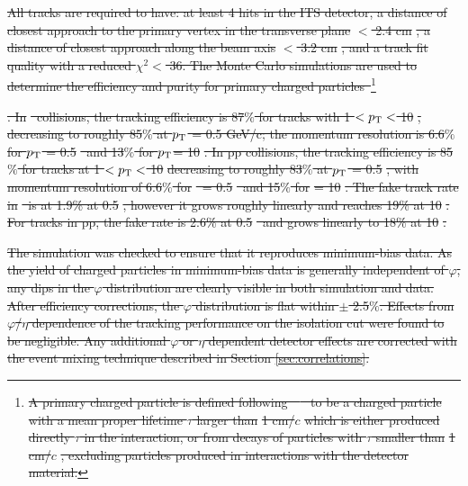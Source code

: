 \documentclass[ALICE,manyauthors]{cernphprep}
\newcommand{\pPb}          {\mbox{p--Pb}\xspace}
\newcommand{\pt}           {\ensuremath{p_{\rm T}}\xspace}
\newcommand{\GeVc}         {Ge\kern-.1emV/$c$\xspace}
\providecommand{\DIFdeltex}[1]{{\protect\color{red}\sout{#1}}}                      %
\providecommand{\DIFdelbegin}{} %
\providecommand{\DIFdel}[1]{\texorpdfstring{\DIFdeltex{#1}}{}} %
\newcommand{\DIFscaledelfig}{0.5}
\newlength{\DIFdelgraphicswidth} %
\newlength{\DIFdelgraphicsheight} %
\newcommand{\DIFdelincludegraphics}[2][]{%
\sbox{\DIFdelgraphicsbox}{\DIFOincludegraphics[#1]{#2}}%
\settoboxwidth{\DIFdelgraphicswidth}{\DIFdelgraphicsbox} %
\settoboxtotalheight{\DIFdelgraphicsheight}{\DIFdelgraphicsbox} %
\scalebox{\DIFscaledelfig}{%
\parbox[b]{\DIFdelgraphicswidth}{\usebox{\DIFdelgraphicsbox}\\[-\baselineskip] \rule{\DIFdelgraphicswidth}{0em}}\llap{\resizebox{\DIFdelgraphicswidth}{\DIFdelgraphicsheight}{%
\setlength{\unitlength}{\DIFdelgraphicswidth}%
\begin{picture}(1,1)%
\thicklines\linethickness{2pt} %
{\color[rgb]{1,0,0}\put(0,0){\framebox(1,1){}}}%
{\color[rgb]{1,0,0}\put(0,0){\line( 1,1){1}}}%
{\color[rgb]{1,0,0}\put(0,1){\line(1,-1){1}}}%
\end{picture}%
}\hspace*{3pt}}} %
} %
\DeclareRobustCommand{\DIFdelbegin}{\DIFOdelbegin \let\includegraphics\DIFdelincludegraphics} %
\begin{document}
\DIFdelbegin \DIFdel{All tracks are required to have: at least 4 hits in the ITS detector, a distance of closest approach to the primary vertex in the transverse plane 
}%
\DIFdel{$<$ 2.4 cm}%
\DIFdel{,  a distance of closest approach along the beam axis }%
\DIFdel{$ < $ 3.2 cm}%
\DIFdel{, and a track fit quality with a reduced $\chi^{2}<$ 36.  
The Monte Carlo simulations are used to determine the efficiency and purity for primary charged particles~}\footnote{\DIFdel{A primary charged particle is defined following~\mbox{%
\cite{ALICE-PUBLIC-2017-005} }%
to be a charged particle with a mean proper lifetime $\tau$ larger than }%
\DIFdel{1 cm/$c$}%
\DIFdel{which is either produced directly $\tau$ in the interaction, or from decays of particles with $\tau$
smaller than }%
\DIFdel{1 cm/$c$}%
\DIFdel{, excluding particles produced in interactions with the detector material.}}%
\addtocounter{footnote}{-1}%
\DIFdel{. In }%
\DIFdel{~collisions, the tracking efficiency is 87$\%$ for tracks with 1 $< \pt <$ 10 }%
\DIFdel{, decreasing to roughly 85$\%$ at $\pt$ = 0.5 GeV/c; the momentum resolution is 6.6$\%$ for $\pt$ = 0.5 }%
\DIFdel{~and 13$\%$ for $\pt$= 10 }%
\DIFdel{. In pp collisions, the tracking efficiency is 85$\%$ for tracks at 1 $< \pt <$ 10 }%
\DIFdel{decreasing to roughly 83$\%$ at $\pt$ = 0.5 }%
\DIFdel{, with momentum resolution of 6.6$\%$ for }%
\DIFdel{~= 0.5 }%
\DIFdel{~and 15$\%$ for }%
\DIFdel{= 10 }%
\DIFdel{. The fake track rate in }%
\DIFdel{~is at 1.9\% at 0.5 }%
\DIFdel{, however it grows roughly linearly and reaches 19\%  at 10 }%
\DIFdel{. For tracks in pp, the fake rate is 2.6\% at 0.5 }%
\DIFdel{~and grows linearly to 18\% at 10 }%
\DIFdel{.
}%

\DIFdel{The simulation was checked to ensure that it reproduces minimum-bias data. As the yield of charged particles in minimum-bias data is generally independent of $\varphi$, any dips in the $\varphi$ distribution are clearly visible in both simulation and data. After efficiency corrections, the $\varphi$ distribution is flat within $\pm$ 2.5$\%$. Effects from $\varphi$/$\eta$ dependence of the tracking performance on the isolation cut were found to be negligible. Any additional $\varphi$ or $\eta$ dependent detector effects are corrected with the event mixing technique described in Section \ref{sec:correlations}.%
}%
\end{document}
